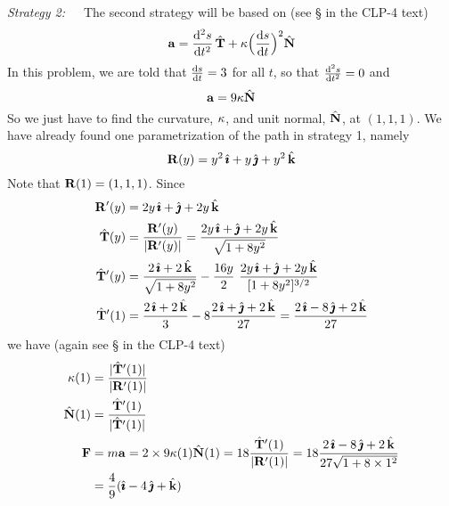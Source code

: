 \begin{solution}
\noindent \emph{Strategy 2:}\ \ \ The second strategy will be based on
(see \S{} in the CLP-4 text)
\begin{equation*}
\va=\difftwo{s}{t}\,\hat\vT +\ka\Big(\diff{s}{t}\Big)^2\hat\vN
\end{equation*}
In this problem, we are told that $\diff{s}{t}=3$ for all $t$,
so that $\difftwo{s}{t}=0$ and
\begin{equation*}
\mathbf{a}=9\kappa\hat{\mathbf{N}}
\end{equation*}
So we just have to find the curvature, $\kappa$, and unit normal, $\hat{\mathbf{N}}$,
at $(1,1,1)$. We have already found one parametrization of the path
in strategy 1, namely
\begin{equation*}
\mathbf{R}(y)=y^2\,\hat{\pmb{\imath}}+ y\,\hat{\pmb{\jmath}} +y^2\,\hat{\mathbf{k}}
\end{equation*}
Note that $\mathbf{R}(1) = (1,1,1)$. Since
\begin{align*}
\mathbf{R}'(y)&=2y\,\hat{\pmb{\imath}}+ \hat{\pmb{\jmath}} +2y\,\hat{\mathbf{k}} \\
\hat{\mathbf{T}}(y)&=\frac{\mathbf{R}'(y)}{|\mathbf{R}'(y)|}
           =\frac{2y\,\hat{\pmb{\imath}}+ \hat{\pmb{\jmath}} +2y\,\hat{\mathbf{k}}}{\sqrt{1+8y^2}} 
\\
\hat{\mathbf{T}}'(y)&= \frac{2\,\hat{\pmb{\imath}} +2\,\hat{\mathbf{k}}}{\sqrt{1+8y^2}}
                 -\frac{16y}{2}\ \frac{2y\,\hat{\pmb{\imath}}+ \hat{\pmb{\jmath}} +2y\,\hat{\mathbf{k}}}{[1+8y^2]^{3/2}}
\\
\hat{\mathbf{T}}'(1)&= \frac{2\,\hat{\pmb{\imath}} +2\,\hat{\mathbf{k}}}{3}
                 -8\frac{2\,\hat{\pmb{\imath}}+ \hat{\pmb{\jmath}} +2\,\hat{\mathbf{k}}}{27}
            =\frac{2\,\hat{\pmb{\imath}}-8\,\hat{\pmb{\jmath}} +2\,\hat{\mathbf{k}}}{27}
\end{align*}
we have (again see \S{} in the CLP-4 text)
\begin{align*}
\kappa(1) &=\frac{|\hat{\mathbf{T}}'(1)|}{|\mathbf{R}'(1)|}
\\
\hat{\mathbf{N}}(1) &=\frac{\hat{\mathbf{T}}'(1)}{|\hat{\mathbf{T}}'(1)|} \\
\mathbf{F}&=m\mathbf{a} = 2\times 9\kappa(1)\hat{\mathbf{N}}(1)
=18\frac{\hat{\mathbf{T}}'(1)}{|\mathbf{R}'(1)|}
=18\frac{2\,\hat{\pmb{\imath}}-8\,\hat{\pmb{\jmath}} +2\,\hat{\mathbf{k}}}{27\sqrt{1+8\times 1^2}} \\
&=\frac{4}{9}(\hat{\pmb{\imath}}-4\,\hat{\pmb{\jmath}}+\hat{\mathbf{k}})
\end{align*}

\end{solution}

